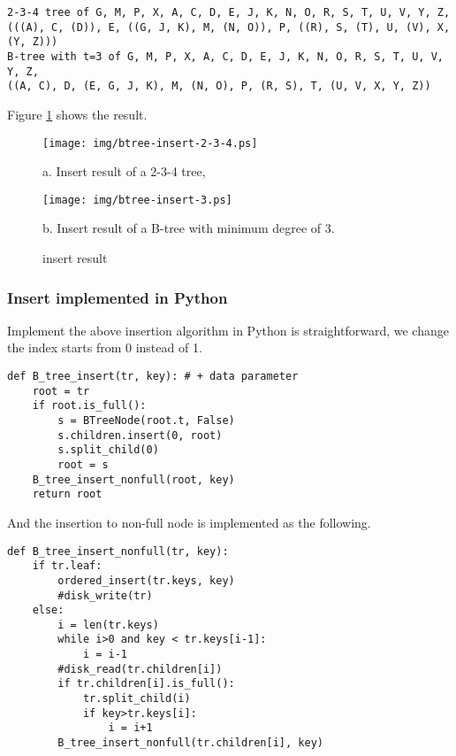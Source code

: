 \documentclass{article}
\begin{document}
\begin{verbatim}
2-3-4 tree of G, M, P, X, A, C, D, E, J, K, N, O, R, S, T, U, V, Y, Z, 
(((A), C, (D)), E, ((G, J, K), M, (N, O)), P, ((R), S, (T), U, (V), X, (Y, Z)))
B-tree with t=3 of G, M, P, X, A, C, D, E, J, K, N, O, R, S, T, U, V, Y, Z, 
((A, C), D, (E, G, J, K), M, (N, O), P, (R, S), T, (U, V, X, Y, Z))
\end{verbatim}

Figure \ref{fig:btree-insert} shows the result.

\begin{figure}[htbp]
  \begin{center}
    \texttt{[image: img/btree-insert-2-3-4.ps]}

    a. Insert result of a 2-3-4 tree,

    \texttt{[image: img/btree-insert-3.ps]}

    b. Insert result of a B-tree with minimum degree of 3. 
    \caption{insert result} \label{fig:btree-insert}
  \end{center}
\end{figure}

\subsubsection*{Insert implemented in Python}
Implement the above insertion algorithm in Python is straightforward, we change
the index starts from 0 instead of 1.

\lstset{language=Python}
\begin{lstlisting}
def B_tree_insert(tr, key): # + data parameter
    root = tr
    if root.is_full():
        s = BTreeNode(root.t, False)
        s.children.insert(0, root)
        s.split_child(0)
        root = s
    B_tree_insert_nonfull(root, key)
    return root
\end{lstlisting}

And the insertion to non-full node is implemented as the following.

\begin{lstlisting}
def B_tree_insert_nonfull(tr, key):
    if tr.leaf:
        ordered_insert(tr.keys, key)
        #disk_write(tr)
    else:
        i = len(tr.keys)
        while i>0 and key < tr.keys[i-1]:
            i = i-1
        #disk_read(tr.children[i])
        if tr.children[i].is_full():
            tr.split_child(i)
            if key>tr.keys[i]:
                i = i+1
        B_tree_insert_nonfull(tr.children[i], key)
\end{lstlisting}
\end{document}
